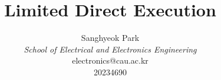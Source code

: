 \documentclass{article}
\begin{document}
\title{\textbf{Limited Direct Execution}\\
}
\author{
    Sanghyeok Park\\
    \textit{School of Electrical and Electronics Engineering}\\
    electronics@cau.ac.kr\\
    20234690
}
\maketitle








\end{document}

